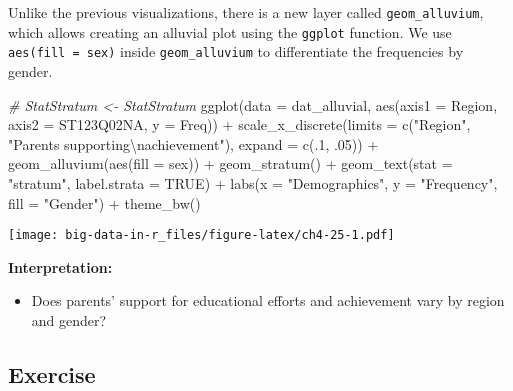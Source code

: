 \documentclass[
]{book}
\newenvironment{Shaded}{\begin{snugshade}}{\end{snugshade}}
\newcommand{\AttributeTok}[1]{\textcolor[rgb]{0.77,0.63,0.00}{#1}}
\newcommand{\CommentTok}[1]{\textcolor[rgb]{0.56,0.35,0.01}{\textit{#1}}}
\newcommand{\ConstantTok}[1]{\textcolor[rgb]{0.00,0.00,0.00}{#1}}
\newcommand{\DecValTok}[1]{\textcolor[rgb]{0.00,0.00,0.81}{#1}}
\newcommand{\FunctionTok}[1]{\textcolor[rgb]{0.00,0.00,0.00}{#1}}
\newcommand{\NormalTok}[1]{#1}
\newcommand{\SpecialCharTok}[1]{\textcolor[rgb]{0.00,0.00,0.00}{#1}}
\newcommand{\StringTok}[1]{\textcolor[rgb]{0.31,0.60,0.02}{#1}}
\providecommand{\tightlist}{%
  \setlength{\itemsep}{0pt}\setlength{\parskip}{0pt}}
\begin{document}
Unlike the previous visualizations, there is a new layer called \texttt{geom\_alluvium}, which allows creating an alluvial plot using the \texttt{ggplot} function. We use \texttt{aes(fill\ =\ sex)} inside \texttt{geom\_alluvium} to differentiate the frequencies by gender.

\begin{Shaded}
\begin{Highlighting}[]
\CommentTok{\# StatStratum \textless{}{-} StatStratum}
\FunctionTok{ggplot}\NormalTok{(}\AttributeTok{data =}\NormalTok{ dat\_alluvial,}
       \FunctionTok{aes}\NormalTok{(}\AttributeTok{axis1 =}\NormalTok{ Region, }\AttributeTok{axis2 =}\NormalTok{ ST123Q02NA, }\AttributeTok{y =}\NormalTok{ Freq)) }\SpecialCharTok{+}
  \FunctionTok{scale\_x\_discrete}\NormalTok{(}\AttributeTok{limits =} \FunctionTok{c}\NormalTok{(}\StringTok{"Region"}\NormalTok{, }\StringTok{"Parents supporting}\SpecialCharTok{\textbackslash{}n}\StringTok{achievement"}\NormalTok{),}
                   \AttributeTok{expand =} \FunctionTok{c}\NormalTok{(.}\DecValTok{1}\NormalTok{, .}\DecValTok{05}\NormalTok{)) }\SpecialCharTok{+}
  \FunctionTok{geom\_alluvium}\NormalTok{(}\FunctionTok{aes}\NormalTok{(}\AttributeTok{fill =}\NormalTok{ sex)) }\SpecialCharTok{+}
  \FunctionTok{geom\_stratum}\NormalTok{() }\SpecialCharTok{+}
  \FunctionTok{geom\_text}\NormalTok{(}\AttributeTok{stat =} \StringTok{"stratum"}\NormalTok{, }\AttributeTok{label.strata =} \ConstantTok{TRUE}\NormalTok{) }\SpecialCharTok{+}
  \FunctionTok{labs}\NormalTok{(}\AttributeTok{x =} \StringTok{"Demographics"}\NormalTok{, }\AttributeTok{y =} \StringTok{"Frequency"}\NormalTok{, }\AttributeTok{fill =} \StringTok{"Gender"}\NormalTok{) }\SpecialCharTok{+}
  \FunctionTok{theme\_bw}\NormalTok{()}
\end{Highlighting}
\end{Shaded}

\texttt{[image: big-data-in-r\_files/figure-latex/ch4-25-1.pdf]}

\textbf{Interpretation:}

\begin{itemize}
\tightlist
\item
  Does parents' support for educational efforts and achievement vary by region and gender?
\end{itemize}

\hypertarget{exercise-2}{%
\subsection{Exercise}\label{exercise-2}}
\end{document}
